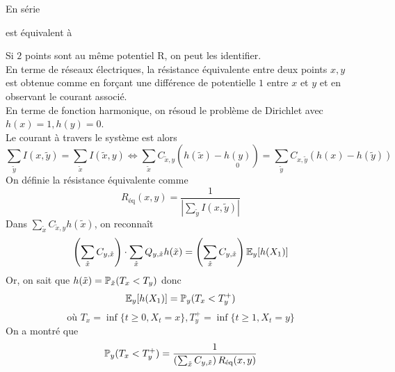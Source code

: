 \documentclass[]{report}
\begin{document}
    En série 
    \begin{center} \end{center}
    \begin{center} est équivalent à \end{center}
\begin{center} \end{center}

    Si $2$ points sont au même potentiel R, on peut les identifier.\\
    En terme de réseaux électriques, la résistance équivalente entre deux points $x,y$ est obtenue comme en forçant une différence de potentielle $1$ entre $x$ et $y$ et en observant le courant associé.\\
    En terme de fonction harmonique, on résoud le problème de Dirichlet avec $h(x)=1,h(y)=0$.\\
    Le courant à travers le système est alors 
    \[\sum_{\tilde{y}}I(x,\tilde{y})=\sum_{\tilde{x}}I(\tilde{x},y)\iff\sum_{\tilde{x}} C_{\tilde{x},y}(h(\tilde{x})-\underset{0}{h(y)})=\sum_{\tilde{y}}C_{x,\tilde{y}}(h(x)-h(\tilde{y}))\]
    On définie la résistance équivalente comme
    \[R_{\text{éq}}(x,y)=\dfrac{1}{|\sum_{\tilde{y}}I(x,\tilde{y})|}\]
    Dans $\sum_{\tilde{x}} C_{\tilde{x},y}h(\tilde{x})$, on reconnaît
    \[\left(\sum_{\tilde{x}}C_{y,\tilde{x}}\right)\cdot \sum_{\tilde{x}}Q_{y,\tilde{x}} h(\tilde{x})=\left(\sum_{\tilde{x}}C_{y,\tilde{x}}\right)\mathbb{E}_{y}[h(X_1)]\]
    Or, on sait que $h(\tilde{x})=\mathbb{P}_{\tilde{x}}(T_x<T_y)$ donc
    \[\mathbb{E}_y[h(X_1)]=\mathbb{P}_y(T_x<T_y^+)\]
    \[\text{où } T_x=\inf \{t\ge 0,X_t=x\},T_y^+=\inf \{t\ge 1,X_t=y\}\]
    On a montré que 
    \[\mathbb{P}_y(T_x<T_y^+)=\dfrac{1}{\left(\sum_{\tilde{x}}C_{y,\tilde{x}}\right)R_{\text{éq}}(x,y)}\]
\end{document}
